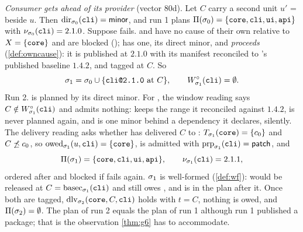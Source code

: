 \begin{example}
\emph{Consumer gets ahead of its provider} (vector 80d). Let $C$ carry a
second unit $u'$ =  beside $u$. Then $\mathrm{dir}_{\sigma_0}(\texttt{cli})
= \mathsf{minor}$, and run 1 plans $\Pi(\sigma_0) =
\{\texttt{core},\texttt{cli},\texttt{ui},\texttt{api}\}$ with $\nu_{\sigma_0}(\texttt{cli})
= 2.1.0$. Suppose  fails.  and  have no cause of
their own relative to $X = \{\texttt{core}\}$ and are blocked ();
 has one, its direct minor, and \emph{proceeds}
(\cref{def:owncause}): it is published at $2.1.0$ with its manifest reconciled
to 's published baseline $1.4.2$, and tagged at $C$. So
\[
  \st_1 = \st_0 \cup \{\code{cli@2.1.0}\ \text{at}\ C\},\qquad
  \Winf{\st_1}{\code{cli}} = \emptyset .
\]
Run 2.  is planned by its direct minor. For , the window
reading says $C \notin W^{\circ}_{\sigma_1}(\texttt{cli})$ and admits nothing: 
keeps the range it reconciled against $1.4.2$, is never planned again, and is
one minor behind a dependency it declares, silently. The delivery reading
asks whether  has delivered $C$ to : $T_{\sigma_1}(\texttt{core})
= \{c_0\}$ and $C \not\preceq c_0$, so $\mathrm{owed}_{\sigma_1}(u,\texttt{cli}) =
\{\texttt{core}\}$,  is admitted with $\mathrm{prp}_{\sigma_1}(\texttt{cli}) =
\mathsf{patch}$, and
\[
  \Pi(\sigma_1) = \{\texttt{core},\texttt{cli},\texttt{ui},\texttt{api}\},\qquad
  \nu_{\sigma_1}(\texttt{cli}) = 2.1.1,
\]
ordered after  and blocked if  fails again. $\sigma_1$ is
well-formed (\cref{def:wf}):  would be released at $C =
\mathrm{basec}_{\sigma_1}(\texttt{cli})$ and still owes , and  is in the
plan after it. Once both are tagged, $\mathrm{dlv}_{\sigma_2}(\texttt{core},C,\texttt{cli})$
holds with $t = C$, nothing is owed, and $\Pi(\sigma_2) = \emptyset$. The plan
of run 2 equals the plan of run 1 although run 1 published a package; that is
the observation \cref{thm:g6} has to accommodate.
\end{example}

